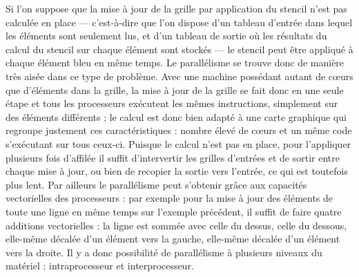 Si l'on suppose que la mise à jour de la grille par application du stencil n'est pas calculée en place --- c'est-à-dire que l'on dispose d'un tableau d'entrée dans lequel les éléments sont seulement lus, et d'un tableau de sortie où les résultats du calcul du stencil sur chaque élément sont stockés --- le stencil peut être appliqué à chaque élément bleu en même temps. Le parallélisme se trouve donc de manière très aisée dans ce type de problème. Avec une  machine possédant autant de cœurs que d'éléments dans la grille, la mise à jour de la grille se fait donc en une seule étape et tous les processeurs exécutent les mêmes instructions, simplement sur des éléments différents ; le calcul est donc bien adapté à une carte graphique qui regroupe justement ces caractéristiques : nombre élevé de cœurs et un même code s'exécutant sur tous ceux-ci. Puisque le calcul n'est pas en place, pour l'appliquer plusieurs fois d'affilée il suffit d'intervertir les grilles d'entrées et de sortir entre chaque mise à jour, ou bien de recopier la sortie vers l'entrée, ce qui est toutefois plus lent. Par ailleurs le parallélisme peut s'obtenir grâce aux capacités vectorielles des processeurs : par exemple pour la mise à jour des éléments de toute une ligne en même temps sur l'exemple précédent, il suffit de faire quatre additions vectorielles : la ligne est sommée avec celle du dessus, celle du dessous, elle-même décalée d'un élément vers la gauche, elle-même décalée d'un élément vers la droite. Il y a donc possibilité de parallélisme à plusieurs niveaux du matériel : intraprocesseur et interprocesseur.

